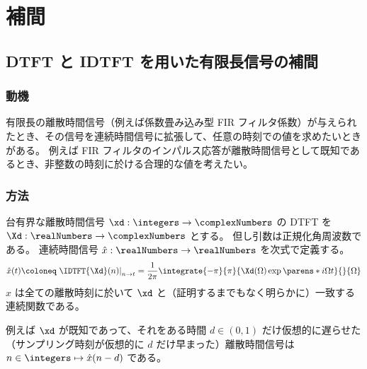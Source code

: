\chapter{補間}
    \section{DTFT と IDTFT を用いた有限長信号の補間}
        \subsection{動機}
            有限長の離散時間信号（例えば係数畳み込み型 FIR フィルタ係数）が与えられたとき、その信号を連続時間信号に拡張して、任意の時刻での値を求めたいときがある。
            例えば FIR フィルタのインパルス応答が離散時間信号として既知であるとき、非整数の時刻に於ける合理的な値を考えたい。
        \subsection{方法}
            台有界な離散時間信号 $\xd:\integers\to\complexNumbers$ の DTFT を $\Xd:\realNumbers\to\complexNumbers$ とする。
            但し引数は正規化角周波数である。
            連続時間信号 $\hat{x}:\realNumbers\to\realNumbers$ を次式で定義する。
            \[ \hat{x}(t)\coloneq\left.\IDTFT{\Xd}(n)\right|_{n\to t} = \frac{1}{2\pi}\integrate{-\pi}{\pi}{\Xd(\Omega)\exp\parens*{i\Omega t}}{}{\Omega} \]
            $\hat{x}$ は全ての離散時刻に於いて $\xd$ と（証明するまでもなく明らかに）一致する連続関数である。
            \par
            例えば $\xd$ が既知であって、それをある時間 $d\in(0,1)$ だけ仮想的に遅らせた（サンプリング時刻が仮想的に $d$ だけ早まった）離散時間信号は $n\in\integers\mapsto\hat{x}(n-d)$ である。

